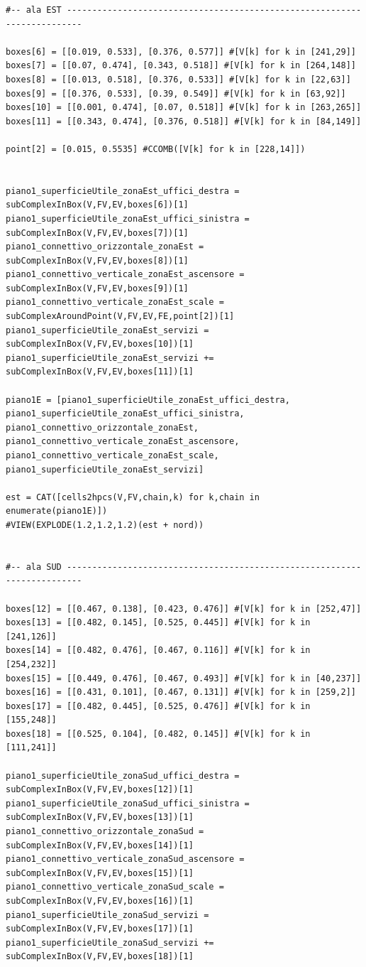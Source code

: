 \documentclass[11pt, oneside]{article}   	%
\begin{document}
\begin{verbatim}
#-- ala EST -------------------------------------------------------------------------

boxes[6] = [[0.019, 0.533], [0.376, 0.577]] #[V[k] for k in [241,29]]
boxes[7] = [[0.07, 0.474], [0.343, 0.518]] #[V[k] for k in [264,148]]
boxes[8] = [[0.013, 0.518], [0.376, 0.533]] #[V[k] for k in [22,63]]
boxes[9] = [[0.376, 0.533], [0.39, 0.549]] #[V[k] for k in [63,92]]
boxes[10] = [[0.001, 0.474], [0.07, 0.518]] #[V[k] for k in [263,265]]
boxes[11] = [[0.343, 0.474], [0.376, 0.518]] #[V[k] for k in [84,149]]

point[2] = [0.015, 0.5535] #CCOMB([V[k] for k in [228,14]])


piano1_superficieUtile_zonaEst_uffici_destra = subComplexInBox(V,FV,EV,boxes[6])[1]
piano1_superficieUtile_zonaEst_uffici_sinistra = subComplexInBox(V,FV,EV,boxes[7])[1]
piano1_connettivo_orizzontale_zonaEst = subComplexInBox(V,FV,EV,boxes[8])[1]
piano1_connettivo_verticale_zonaEst_ascensore = subComplexInBox(V,FV,EV,boxes[9])[1]
piano1_connettivo_verticale_zonaEst_scale = subComplexAroundPoint(V,FV,EV,FE,point[2])[1]
piano1_superficieUtile_zonaEst_servizi = subComplexInBox(V,FV,EV,boxes[10])[1]
piano1_superficieUtile_zonaEst_servizi += subComplexInBox(V,FV,EV,boxes[11])[1]

piano1E = [piano1_superficieUtile_zonaEst_uffici_destra, piano1_superficieUtile_zonaEst_uffici_sinistra, piano1_connettivo_orizzontale_zonaEst, piano1_connettivo_verticale_zonaEst_ascensore, piano1_connettivo_verticale_zonaEst_scale, piano1_superficieUtile_zonaEst_servizi]

est = CAT([cells2hpcs(V,FV,chain,k) for k,chain in enumerate(piano1E)])
#VIEW(EXPLODE(1.2,1.2,1.2)(est + nord))


#-- ala SUD -------------------------------------------------------------------------

boxes[12] = [[0.467, 0.138], [0.423, 0.476]] #[V[k] for k in [252,47]]
boxes[13] = [[0.482, 0.145], [0.525, 0.445]] #[V[k] for k in [241,126]]
boxes[14] = [[0.482, 0.476], [0.467, 0.116]] #[V[k] for k in [254,232]]
boxes[15] = [[0.449, 0.476], [0.467, 0.493]] #[V[k] for k in [40,237]]
boxes[16] = [[0.431, 0.101], [0.467, 0.131]] #[V[k] for k in [259,2]]
boxes[17] = [[0.482, 0.445], [0.525, 0.476]] #[V[k] for k in [155,248]]
boxes[18] = [[0.525, 0.104], [0.482, 0.145]] #[V[k] for k in [111,241]]

piano1_superficieUtile_zonaSud_uffici_destra = subComplexInBox(V,FV,EV,boxes[12])[1]
piano1_superficieUtile_zonaSud_uffici_sinistra = subComplexInBox(V,FV,EV,boxes[13])[1]
piano1_connettivo_orizzontale_zonaSud = subComplexInBox(V,FV,EV,boxes[14])[1]
piano1_connettivo_verticale_zonaSud_ascensore = subComplexInBox(V,FV,EV,boxes[15])[1]
piano1_connettivo_verticale_zonaSud_scale = subComplexInBox(V,FV,EV,boxes[16])[1]
piano1_superficieUtile_zonaSud_servizi = subComplexInBox(V,FV,EV,boxes[17])[1]
piano1_superficieUtile_zonaSud_servizi += subComplexInBox(V,FV,EV,boxes[18])[1]


\end{verbatim}
\end{document}
